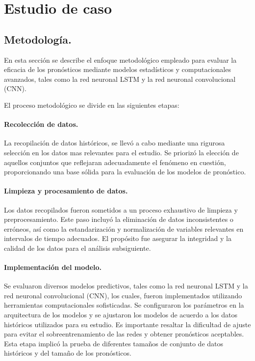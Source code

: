 \documentclass[
  us-letterpaper,
]{scrreprt}
\theoremstyle{plain}
\theoremstyle{definition}
\theoremstyle{definition}
\theoremstyle{remark}
\begin{document}
\part{Estudio de caso}

\chapter{Metodología.}\label{metodologuxeda.}

En esta sección se describe el enfoque metodológico empleado para
evaluar la eficacia de los pronósticos mediante modelos estadísticos y
computacionales avanzados, tales como la red neuronal LSTM y la red
neuronal convolucional (CNN).

El proceso metodológico se divide en las siguientes etapas:

\subsection{Recolección de datos.}\label{recolecciuxf3n-de-datos.}

La recopilación de datos históricos, se llevó a cabo mediante una
rigurosa selección en los datos mas relevantes para el estudio. Se
priorizó la elección de aquellos conjuntos que reflejaran adecuadamente
el fenómeno en cuestión, proporcionando una base sólida para la
evaluación de los modelos de pronóstico.

\subsection{Limpieza y procesamiento de
datos.}\label{limpieza-y-procesamiento-de-datos.}

Los datos recopilados fueron sometidos a un proceso exhaustivo de
limpieza y preprocesamiento. Este paso incluyó la eliminación de datos
inconsistentes o erróneos, así como la estandarización y normalización
de variables relevantes en intervalos de tiempo adecuados. El propósito
fue asegurar la integridad y la calidad de los datos para el análisis
subsiguiente.

\subsection{Implementación del
modelo.}\label{implementaciuxf3n-del-modelo.}

Se evaluaron diversos modelos predictivos, tales como la red neuronal
LSTM y la red neuronal convolucional (CNN), los cuales, fueron
implementados utilizando herramientas computacionales sofisticadas. Se
configuraron los parámetros en la arquitectura de los modelos y se
ajustaron los modelos de acuerdo a los datos históricos utilizados para
su estudio. Es importante resaltar la dificultad de ajuste para evitar
el sobreentrenamiento de las redes y obtener pronósticos aceptables.
Esta etapa implicó la prueba de diferentes tamaños de conjunto de datos
históricos y del tamaño de los pronósticos.
\end{document}
